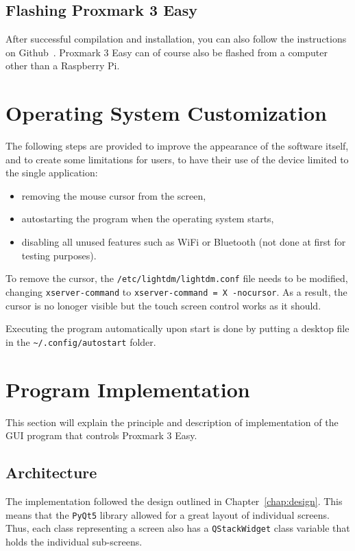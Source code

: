 \subsection{Flashing Proxmark 3 Easy}

After successful compilation and installation, you can also follow the instructions on Github~\cite{githubproxmarkdoc}. Proxmark 3 Easy can of course also be flashed from a computer other than a Raspberry Pi. 

\section{Operating System Customization}

The following steps are provided to improve the appearance of the software itself, and to create some limitations for users, to have their use of the device limited to the single application:

\begin{itemize}
    \item removing the mouse cursor from the screen,
    \item autostarting the program when the operating system starts,
    \item disabling all unused features such as WiFi or Bluetooth (not done at first for testing purposes).
\end{itemize}

To remove the cursor, the \texttt{/etc/lightdm/lightdm.conf} file needs to be modified, changing \texttt{xserver-command} to \texttt{xserver-command = X -nocursor}. As a result, the cursor is no lonoger visible but the touch screen control works as it should.

Executing the program automatically upon start is done by putting a desktop file in the \texttt{\textasciitilde{}/.config/autostart} folder.


\section{Program Implementation}

This section will explain the principle and description of implementation of the GUI program that controls Proxmark 3 Easy.

\subsection{Architecture}

The implementation followed the design outlined in Chapter~\ref{chap:design}. This means that the \texttt{PyQt5} library allowed for a great layout of individual screens. Thus, each class representing a screen also has a \texttt{QStackWidget} class variable that holds the individual sub-screens.


